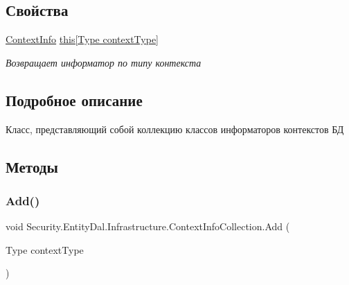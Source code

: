 \subsection*{Свойства}
\begin{DoxyCompactItemize}
\item 
\hyperlink{class_security_1_1_entity_dal_1_1_infrastructure_1_1_context_info}{Context\+Info} \hyperlink{class_security_1_1_entity_dal_1_1_infrastructure_1_1_context_info_collection_af147ecc564c120bef48919a2dfa0b093}{this\mbox{[}\+Type context\+Type\mbox{]}}
\begin{DoxyCompactList}\small\item\em Возвращает информатор по типу контекста \end{DoxyCompactList}\end{DoxyCompactItemize}


\subsection{Подробное описание}
Класс, представляющий собой коллекцию классов информаторов контекстов БД 



\subsection{Методы}
\mbox{\label{class_security_1_1_entity_dal_1_1_infrastructure_1_1_context_info_collection_a44def64b4da0e4d81c8c5c57bcb1a56b}} 
\subsubsection{\texorpdfstring{Add()}{Add()}}
{\footnotesize\ttfamily void Security.\+Entity\+Dal.\+Infrastructure.\+Context\+Info\+Collection.\+Add (\begin{DoxyParamCaption}\item[{Type}]{context\+Type }\end{DoxyParamCaption})}



